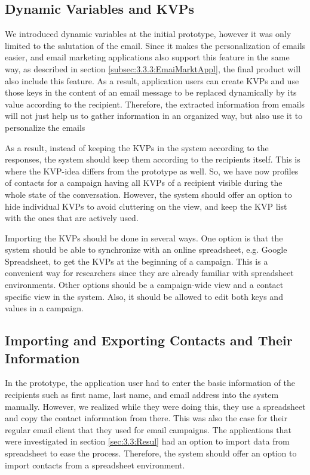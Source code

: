 \subsection{Dynamic Variables and \ac{KVP}s}
\label{subsec:5.1.2:DynmVariKVPs}
We introduced dynamic variables at the initial prototype, however it was only limited to the salutation of the email. Since it makes the personalization of emails easier, and email marketing applications also support this feature in the same way, as described in section \ref{subsec:3.3.3:EmaiMarktAppl}, the final product will also include this feature. As a result, application users can create \ac{KVP}s and use those keys in the content of an email message to be replaced dynamically by its value according to the recipient. Therefore, the extracted information from emails will not just help us to gather information in an organized way, but also use it to personalize the emails
\vspace{1cm}

As a result, instead of keeping the \ac{KVP}s in the system according to the responses, the system should keep them according to the recipients itself. This is where the \ac{KVP}-idea differs from the prototype as well. So, we have now profiles of contacts for a campaign having all \ac{KVP}s of a recipient visible during the whole state of the conversation. However, the system should offer an option to hide individual \ac{KVP}s to avoid cluttering on the view, and keep the \ac{KVP} list with the ones that are actively used.

\vspace{1cm}
Importing the \ac{KVP}s should be done in several ways. One option is that the system should be able to synchronize with an online spreadsheet, e.g. Google Spreadsheet, to get the \ac{KVP}s at the beginning of a campaign. This is a convenient way for researchers since they are already familiar with spreadsheet environments. Other options should be a campaign-wide view and a contact specific view in the system. Also, it should be allowed to edit both keys and values in a campaign.

\subsection{Importing and Exporting Contacts and Their Information}
\label{subsec:5.1.3:ImpoExpoContInfo}
In the prototype, the application user had to enter the basic information of the recipients such as first name, last name, and email address into the system manually. However, we realized while they were doing this, they use a spreadsheet and copy the contact information from there. This was also the case for their regular email client that they used for email campaigns. The applications that were investigated in section \ref{sec:3.3:Resul} had an option to import data from spreadsheet to ease the process. Therefore, the system should offer an option to import contacts from a spreadsheet environment.
\vspace{1cm}

